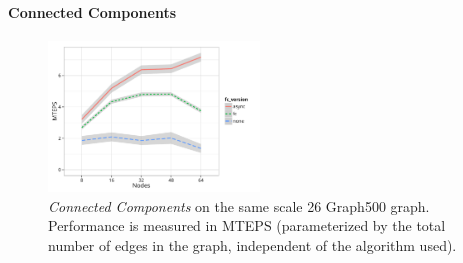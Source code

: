 \paragraph{Connected Components}

\begin{figure}[t]
  \centering
  \includegraphics[width=0.5\textwidth]{data/plots/cc_perf.pdf}
  \caption{\emph{Connected Components} on the same scale 26 Graph500 graph. Performance is measured in MTEPS (parameterized by the total number of edges in the graph, independent of the algorithm used).}
  \label{fig:cc_perf}
\end{figure}

